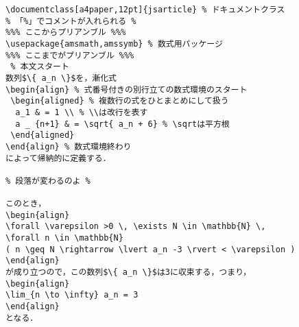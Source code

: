 \begin{verbatim}
\documentclass[a4paper,12pt]{jsarticle} % ドキュメントクラス
% 「%」でコメントが入れられる %
%%% ここからプリアンブル %%%
\usepackage{amsmath,amssymb} % 数式用パッケージ
%%% ここまでがプリアンブル %%%
 % 本文スタート
数列$\{ a_n \}$を，漸化式
\begin{align} % 式番号付きの別行立ての数式環境のスタート
 \begin{aligned} % 複数行の式をひとまとめにして扱う
  a_1 & = 1 \\ % \\は改行を表す
  a _ {n+1} & = \sqrt{ a_n + 6} % \sqrtは平方根
 \end{aligned}
\end{align} % 数式環境終わり
によって帰納的に定義する．

% 段落が変わるのよ %

このとき，
\begin{align} 
\forall \varepsilon >0 \, \exists N \in \mathbb{N} \, 
\forall n \in \mathbb{N} 
( n \geq N \rightarrow \lvert a_n -3 \rvert < \varepsilon )
\end{align} 
が成り立つので，この数列$\{ a_n \}$は3に収束する，つまり，
\begin{align}
\lim_{n \to \infty} a_n = 3
\end{align}
となる．

\end{verbatim}